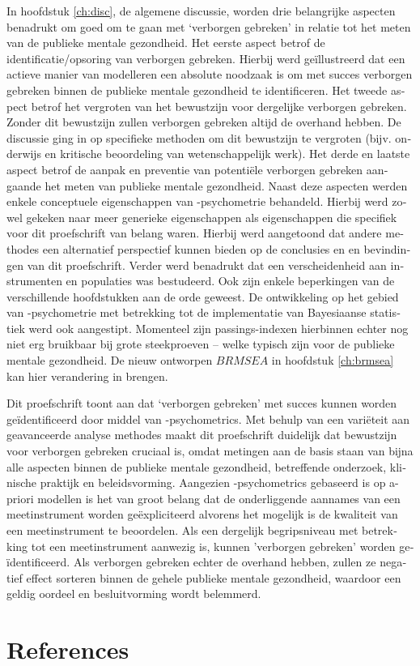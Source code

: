 \begin{otherlanguage}{dutch}
In hoofdstuk \ref{ch:disc}, de algemene discussie, worden drie belangrijke aspecten benadrukt om goed om te gaan met `verborgen gebreken' in relatie tot het meten van de publieke mentale gezondheid. Het eerste aspect betrof de identificatie/opsoring van verborgen gebreken. Hierbij werd ge\"illustreerd dat een actieve manier van modelleren een absolute noodzaak is om met succes verborgen gebreken binnen de publieke mentale gezondheid te identificeren. Het tweede aspect betrof het vergroten van het bewustzijn voor dergelijke verborgen gebreken. Zonder dit bewustzijn zullen verborgen gebreken altijd de overhand hebben. De discussie ging in op specifieke methoden om dit bewustzijn te vergroten (bijv. onderwijs en kritische beoordeling van wetenschappelijk werk). Het derde en laatste aspect betrof de aanpak en preventie van potenti\"ele verborgen gebreken aangaande het meten van publieke mentale gezondheid. Naast deze aspecten werden enkele conceptuele eigenschappen van \textbeta-psychometrie behandeld. Hierbij werd zowel gekeken naar meer generieke eigenschappen als eigenschappen die specifiek voor dit proefschrift van belang waren. Hierbij werd aangetoond dat andere methodes een alternatief perspectief kunnen bieden op de conclusies en en bevindingen van dit proefschrift. Verder werd benadrukt dat een verscheidenheid aan instrumenten en populaties was bestudeerd. Ook zijn enkele beperkingen van de verschillende hoofdstukken aan de orde geweest. De ontwikkeling op het gebied van \textbeta-psychometrie met betrekking tot de implementatie van Bayesiaanse statistiek werd ook aangestipt. Momenteel zijn passings-indexen hierbinnen echter nog niet erg bruikbaar bij grote steekproeven -- welke typisch zijn voor de publieke mentale gezondheid. De nieuw ontworpen $BRMSEA$ in hoofdstuk \ref{ch:brmsea} kan hier verandering in brengen.

Dit proefschrift toont aan dat `verborgen gebreken' met succes kunnen worden ge\"identificeerd door middel van \textbeta-psychometrics. Met behulp van een vari\"eteit aan geavanceerde analyse methodes maakt dit proefschrift duidelijk dat bewustzijn voor verborgen gebreken cruciaal is, omdat metingen aan de basis staan van bijna alle aspecten binnen de publieke mentale gezondheid, betreffende onderzoek, klinische praktijk en beleidsvorming. Aangezien \textbeta-psychometrics gebaseerd is op a-priori modellen is het van groot belang dat de onderliggende aannames van een meetinstrument worden ge\"expliciteerd alvorens het mogelijk is de kwaliteit van een meetinstrument te beoordelen. Als een dergelijk begripsniveau met betrekking tot een meetinstrument aanwezig is, kunnen 'verborgen gebreken' worden ge\"identificeerd. Als verborgen gebreken echter de overhand hebben, zullen ze negatief effect sorteren binnen de gehele publieke mentale gezondheid, waardoor een geldig oordeel en besluitvorming wordt belemmerd.

\sloppy
\section*{References}
\printbibliography[heading=none]

\fussy
\end{otherlanguage}
